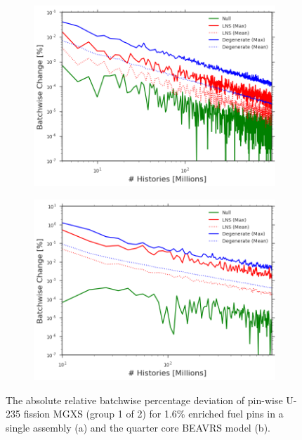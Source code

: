 \begin{figure}[h!]
\centering
\begin{subfigure}{.87\textwidth}
  \centering
  \includegraphics[width=\linewidth]{figures/patterns/convergence/assm-16/assm-16-dev-capture-1}
  \caption{}
  \label{fig:chap9-assm-16-dev-capt-1}
\end{subfigure}
\begin{subfigure}{.87\textwidth}
  \centering
  \includegraphics[width=\linewidth]{figures/patterns/convergence/full-core/16-enr-dev-capture-1}
  \caption{}
  \label{fig:chap9-full-core-dev-capt-1}
\end{subfigure}
\caption[Convergence of U-238 capture MGXS batchwise deviation]{The absolute relative batchwise percentage deviation of pin-wise U-235 fission \ac{MGXS} (group 1 of 2) for 1.6\% enriched fuel pins in a single assembly (a) and the quarter core \ac{BEAVRS} model (b).}
\label{fig:chap9-capt-1-dev}
\end{figure}

